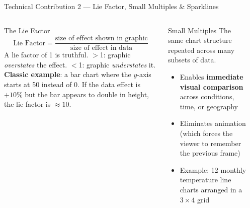 \documentclass[aspectratio=169,10pt]{beamer}
\begin{document}
\begin{frame}{Technical Contribution 2 — Lie Factor, Small Multiples \& Sparklines}
  \begin{columns}[T]
      \begin{block}{The Lie Factor}
        \[
          \text{Lie Factor} =
          \frac{\text{size of effect shown in graphic}}
               {\text{size of effect in data}}
        \]
        A lie factor of 1 is truthful.
        $>$1: graphic \emph{overstates} the effect.
        $<$1: graphic \emph{understates} it.\\[4pt]
        \textbf{Classic example}: a bar chart where the $y$-axis
        starts at 50 instead of 0.
        If the data effect is $+10\%$ but the bar appears to double
        in height, the lie factor is $\approx 10$.
      \end{block}
      \vspace{5pt}
      \begin{block}{Small Multiples}
        The same chart structure repeated across many subsets of data.
        \begin{itemize}
          \item Enables \textbf{immediate visual comparison}
                across conditions, time, or geography
          \item Eliminates animation (which forces the viewer to remember
                the previous frame)
          \item Example: 12 monthly temperature line charts
                arranged in a $3 \times 4$ grid
        \end{itemize}
      \end{block}

      \begin{center}
\end{center}
\end{columns}
\end{frame}
\end{document}
